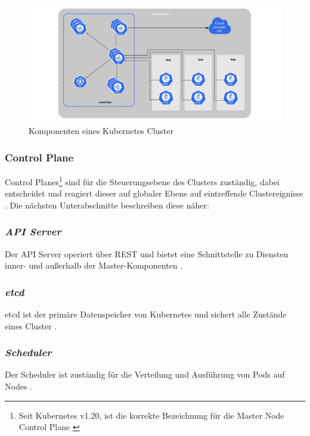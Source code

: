 \begin{figure}
    \centering
    \includegraphics[width=1.0\columnwidth]{images/components-of-kubernetes.png}
    \caption{Komponenten eines Kubernetes Cluster \cite{kubernetesnodekomponenten}}
    \label{fig:cluster}
\end{figure}

\subsubsection{Control Plane}
Control Planes\footnote{Seit Kubernetes v1.20, ist die korrekte Bezeichnung für die Master Node Control Plane \cite{Kuberneteschangemaster}} sind für die Steuerungsebene des Clusters zuständig,
dabei entscheidet und reagiert dieser auf globaler Ebene auf eintreffende Clustereignisse \cite{kuberneteskomponenten}.
Die nächsten Unterabschnitte beschreiben diese näher:

\subsubsection{\textit{API Server}}
Der API Server operiert über REST und bietet eine Schnittstelle zu Diensten
inner- und außerhalb der Master-Komponenten \cite{kuberneteskomponenten}.

\subsubsection{\textit{etcd}}
etcd ist der primäre Datenspeicher von Kubernetes und sichert alle Zustände eines
Cluster \cite{kuberneteskomponenten}.

\subsubsection{\textit{Scheduler}}
Der Scheduler ist zuständig für die Verteilung und Ausführung von Pods auf Nodes \cite{kuberneteskomponenten}.

